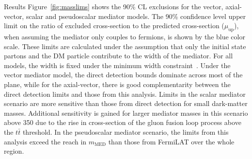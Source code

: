 \begin{section}{Results}
Figure~\ref{fig:masslims} shows the 90\% CL exclusions for the vector, axial-vector, 
scalar and pseudoscalar mediator models.  The 90\% confidence level upper limit on the ratio of excluded cross-section to the predicted cross-section ($\mu_{\textrm{up}}$), 
when assuming the mediator only couples to fermions, is shown by the blue color scale. These limits are calculated under the assumption 
that only the initial state partons and the DM 
particle contribute to the width of the mediator. For all models, the width is fixed under the minimum width constraint~\cite{An:2012va,Abercrombie:2015wmb,Fox:2011pm,simplified1}. 
%
Under the vector mediator model, the direct detection bounds dominate across most of the plane, while for the axial-vector, there is good complementarity between the direct detection limits and 
those from this analysis. Limits in the scalar mediator scenario are more sensitive than those from direct detection for small dark-matter masses. Additional sensitivity is gained
for larger mediator masses in this scenario above 350 \GeV due to the rise in cross-section of the gluon fusion loop process above the $t\bar{t}$ threshold. 
In the pseudoscalar mediator scenario, the limits from this analysis exceed the reach in $m_{\mathrm{MED}}$ than those from FermiLAT over the whole region.


\end{section}
